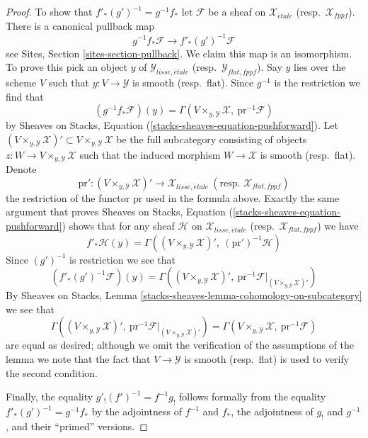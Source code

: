 \documentclass[10pt,a4paper]{amsart}
\theoremstyle{plain}
\theoremstyle{definition}
\theoremstyle{remark}
\numberwithin{equation}{subsection}
\def\etale{{\acute{e}tale}}
\begin{document}
\begin{proof}
\medskip\noindent
To show that $f'_*(g')^{-1} = g^{-1}f_*$ let $\mathcal{F}$ be a sheaf
on $\mathcal{X}_\etale$ (resp.\ $\mathcal{X}_{fppf}$).
There is a canonical pullback map
$$
g^{-1}f_*\mathcal{F} \longrightarrow f'_*(g')^{-1}\mathcal{F}
$$
see Sites, Section \ref{sites-section-pullback}.
We claim this map is an isomorphism.
To prove this pick an object $y$ of $\mathcal{Y}_{lisse,\etale}$
(resp.\ $\mathcal{Y}_{flat,fppf}$). Say $y$ lies over the scheme $V$
such that $y : V \to \mathcal{Y}$ is smooth (resp.\ flat). Since
$g^{-1}$ is the restriction we find that
$$
\left(g^{-1}f_*\mathcal{F}\right)(y) =
\Gamma(V \times_{y, \mathcal{Y}} \mathcal{X},\ \text{pr}^{-1}\mathcal{F})
$$
by Sheaves on Stacks, Equation (\ref{stacks-sheaves-equation-pushforward}).
Let
$(V \times_{y, \mathcal{Y}} \mathcal{X})' \subset
V \times_{y, \mathcal{Y}} \mathcal{X}$
be the full subcategory consisting of objects
$z : W \to V \times_{y, \mathcal{Y}} \mathcal{X}$ such that the induced
morphism $W \to \mathcal{X}$ is smooth (resp.\ flat). Denote
$$
\text{pr}' :
(V \times_{y, \mathcal{Y}} \mathcal{X})'
\longrightarrow
\mathcal{X}_{lisse,\etale}
\ (\text{resp. }\mathcal{X}_{flat,fppf})
$$
the restriction of the functor $\text{pr}$ used in the formula above.
Exactly the same argument that proves
Sheaves on Stacks, Equation (\ref{stacks-sheaves-equation-pushforward})
shows that for any sheaf $\mathcal{H}$ on $\mathcal{X}_{lisse,\etale}$
(resp.\ $\mathcal{X}_{flat,fppf}$) we have
\begin{equation}
\label{equation-pushforward-lisse-etale}
f'_*\mathcal{H}(y) =
\Gamma((V \times_{y, \mathcal{Y}} \mathcal{X})',
\ (\text{pr}')^{-1}\mathcal{H})
\end{equation}
Since $(g')^{-1}$ is restriction we see that
$$
\left(f'_*(g')^{-1}\mathcal{F}\right)(y) =
\Gamma((V \times_{y, \mathcal{Y}} \mathcal{X})',
\ \text{pr}^{-1}\mathcal{F}|_{(V \times_{y, \mathcal{Y}} \mathcal{X})'})
$$
By
Sheaves on Stacks, Lemma \ref{stacks-sheaves-lemma-cohomology-on-subcategory}
we see that
$$
\Gamma((V \times_{y, \mathcal{Y}} \mathcal{X})',
\ \text{pr}^{-1}\mathcal{F}|_{(V \times_{y, \mathcal{Y}} \mathcal{X})'})
=
\Gamma(V \times_{y, \mathcal{Y}} \mathcal{X},\ \text{pr}^{-1}\mathcal{F})
$$
are equal as desired; although we omit the verification of the assumptions
of the lemma we note that the fact that $V \to \mathcal{Y}$ is smooth
(resp.\ flat) is used to verify the second condition.

\medskip\noindent
Finally, the equality $g'_!(f')^{-1} = f^{-1}g_!$ follows formally from
the equality $f'_*(g')^{-1} = g^{-1}f_*$ by the adjointness of
$f^{-1}$ and $f_*$, the adjointness of $g_!$ and $g^{-1}$, and their
``primed'' versions.
\end{proof}
\end{document}
